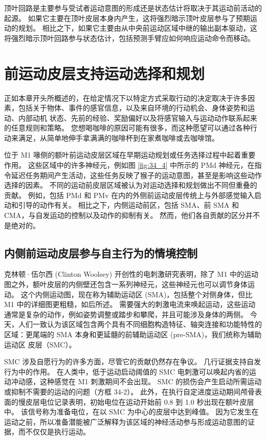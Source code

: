 顶叶回路是主要参与受试者运动意图的形成还是状态估计将取决于其运动前活动的起源。 如果它主要在顶叶皮层本身内产生，这将强烈暗示顶叶皮层参与了预期运动的规划。 相比之下，如果它主要由从中央前运动区域中继的输出副本驱动，这将强烈暗示顶叶回路参与状态估计，包括预测手臂应如何响应运动命令而移动。



\section{前运动皮层支持运动选择和规划}
正如本章开头所概述的，在给定情况下以特定方式采取行动的决定取决于许多因素，包括关于物体、事件的感官信息，以及来自环境的行动机会、身体姿势和运动、内部动机 状态、先前的经验、奖励偏好以及将感官输入与运动动作联系起来的任意规则和策略。 您想喝咖啡的原因可能有很多，而这种愿望可以通过各种行动来满足，从简单地伸手拿满满的咖啡杯到在家煮咖啡或去咖啡馆。

位于 M1 喙侧的额叶前运动皮层区域在早期运动规划或任务选择过程中起着重要作用。 这些区域中的许多神经元，例如图 \ref{fig:34_4} 中所示的 PMd 神经元，在指令延迟任务期间产生活动，这些任务反映了猴子的运动意图，甚至是影响这些动作选择的因素。 不同的运动前皮层区域被认为对运动选择和规划做出不同但重叠的贡献。 例如，包括 PMd 和 PMv 在内的外侧前运动皮层传统上与外部感觉输入启动和引导的动作有关。 相比之下，内侧运动前区，包括 SMA、前 SMA 和 CMA，与自发运动的控制以及动作的抑制有关。 然而，他们各自贡献的区分并不是绝对的。


\subsection{内侧前运动皮层参与自主行为的情境控制}

克林顿·伍尔西 (Clinton Woolsey) 开创性的电刺激研究表明，除了 M1 中的运动图之外，额叶皮层的内侧壁还包含一系列神经元，这些神经元也可以调节身体运动。 这个内侧运动图，现在称为辅助运动区 (SMA)，包括整个对侧身体，但比 M1 中的详细图更粗糙，如后所述。 需要强大的刺激电流来唤起运动，这些运动通常是复杂的动作，例如姿势调整或踏步和攀爬，并且可能涉及身体的两侧。 今天，人们一致认为该区域包含两个具有不同细胞构造特征、轴突连接和功能特性的区域：更尾端的 SMA 本身和更延髓的前辅助运动区 (pre-SMA)，我们统称为辅助运动区 皮层（SMC）。

SMC 涉及自愿行为的许多方面，尽管它的贡献仍然存在争议。 几行证据支持自发行为中的作用。 在人类中，低于运动启动阈值的 SMC 电刺激可以唤起内省的运动冲动感，这种感觉在 M1 刺激期间不会出现。 SMC 的损伤会产生启动所需运动或抑制不需要的运动的问题（方框 34-2）。 此外，在执行自定进度运动期间颅骨表面的慢皮层电位记录表明，初始电位在运动开始前 0.8 到 1.0 秒出现在额叶皮层中。 该信号称为准备电位，在以 SMC 为中心的皮层中达到峰值。 因为它发生在运动之前，所以准备潜能被广泛解释为该区域的神经活动参与形成运动意图的证据，而不仅仅是执行运动。

